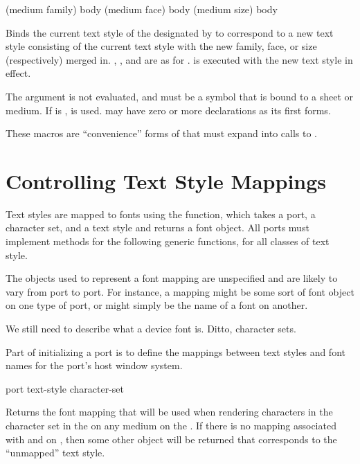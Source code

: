  {(medium family) \body body}
   {(medium face) \body body}
   {(medium size) \body body}

Binds the current text style of the  designated by  to
correspond to a new text style consisting of the current text style with the new
family, face, or size (respectively) merged in.  , , and
 are as for .   is executed with the new
text style in effect.

The  argument is not evaluated, and must be a symbol that is bound
to a sheet or medium.  If  is ,  is
used.   may have zero or more declarations as its first forms.

These macros are ``convenience'' forms of  that must expand
into calls to .


\section {Controlling Text Style Mappings}

Text styles are mapped to fonts using the  function,
which takes a port, a character set, and a text style and returns a font
object.  All ports must implement methods for the following generic functions,
for all classes of text style.

The objects used to represent a font mapping are unspecified and are likely to
vary from port to port.  For instance, a mapping might be some sort of font
object on one type of port, or might simply be the name of a font on another.

 {We still need to describe what a device font is.  Ditto, character
sets.}

Part of initializing a port is to define the mappings between text styles and
font names for the port's host window system.

 {port text-style \optional character-set}

Returns the font mapping that will be used when rendering characters in the
character set  in the   on
any medium on the  .  If there is no mapping associated
with  and  on , then some other
object will be returned that corresponds to the ``unmapped'' text style.

